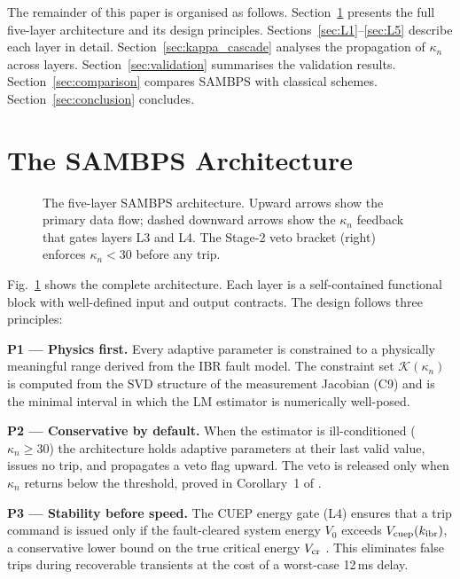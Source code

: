 \documentclass[journal,twoside,10pt]{IEEEtran}
\newcommand{\kappan}{\kappa_{n}}
\newcommand{\kibr}{k_{\rm ibr}}
\newcommand{\calK}{\mathcal{K}}
\begin{document}
The remainder of this paper is organised as follows.
Section~\ref{sec:architecture} presents the full five-layer
architecture and its design principles.  Sections~\ref{sec:L1}--\ref{sec:L5}
describe each layer in detail.  Section~\ref{sec:kappa_cascade} analyses
the propagation of $\kappan$ across layers.  Section~\ref{sec:validation}
summarises the validation results.  Section~\ref{sec:comparison}
compares SAMBPS with classical schemes.  Section~\ref{sec:conclusion}
concludes.

\section{The SAMBPS Architecture}
\label{sec:architecture}

\begin{figure}[!t]
\centering
\resizebox{\columnwidth}{!}{%
%
}
\caption{The five-layer SAMBPS architecture.  Upward arrows show the
  primary data flow; dashed downward arrows show the $\kappan$
  feedback that gates layers L3 and L4.  The Stage-2 veto bracket
  (right) enforces $\kappan < 30$ before any trip.}
\label{fig:sambps_5layer}
\end{figure}

Fig.~\ref{fig:sambps_5layer} shows the complete architecture.  Each
layer is a self-contained functional block with well-defined input and
output contracts.  The design follows three principles:

\textbf{P1 — Physics first.}  Every adaptive parameter is constrained
to a physically meaningful range derived from the IBR fault model.
The constraint set $\calK(\kappan)$ is computed from the SVD structure
of the measurement Jacobian (C9) and is the minimal interval in which
the LM estimator is numerically well-posed.

\textbf{P2 — Conservative by default.}  When the estimator is
ill-conditioned ($\kappan \geq 30$) the architecture holds adaptive
parameters at their last valid value, issues no trip, and propagates
a veto flag upward.  The veto is released only when $\kappan$ returns
below the threshold, proved in Corollary~1 of \cite{sambps_c1_adaptive_slope}.

\textbf{P3 — Stability before speed.}  The CUEP energy gate (L4)
ensures that a trip command is issued only if the fault-cleared
system energy $V_0$ exceeds $V_{\rm cuep}(\kibr)$, a conservative
lower bound on the true critical energy $V_{\rm cr}$
\cite{sambps_c13_cuep}.  This eliminates false trips during
recoverable transients at the cost of a worst-case 12\,ms delay.
\end{document}
